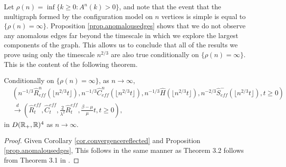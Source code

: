 Let $\rho(n)=\inf\{k\geq 0:A^n(k)>0\}$, and note that the event that the multigraph formed by the configuration model on $n$ vertices is simple is equal to $\{\rho(n)=\infty\}$. Proposition \ref{prop.anomalousedges} shows that we do not observe any anomalous edges far beyond the timescale in which we explore the largest components of the graph. This allows us to conclude that all of the results we prove using only the timescale $n^{2/3}$ are also true conditionally on $\{\rho(n)=\infty\}$. This is the content of the following theorem.
\begin{theorem}
Conditionally on $\{\rho(n)=\infty\}$, as $n\to \infty$, 
\begin{align*}&\left(n^{-1/3}\hat{R}^n_{eff}\left(\lfloor n^{2/3}t\rfloor\right),n^{-1/3}\hat{C}^n_{eff}\left(\lfloor n^{2/3}t\rfloor\right),n^{-1/3}\hat{H}\left( \lfloor n^{2/3} t \rfloor \right),n^{-2/3}\hat{S}^-_{eff}\left(\lfloor n^{2/3}t\rfloor \right), t\geq 0\right)\\
&\overset{d}{\to}\left(\hat{R}^{eff}_t,\hat{C}^{eff}_t, \frac{2}{\lambda^2}\hat{R}^{eff}_t ,\frac{\beta-\mu}{\mu}t,  t\geq 0\right),\end{align*}
in $D({\mathbb R}_+,{\mathbb R})^4$ as $n\to \infty$.
\end{theorem}
\begin{proof}
Given Corollary \ref{cor.convergencereflected} and Proposition \ref{prop.anomalousedges}, This follows in the same manner as Theorem 3.2 follows from Theorem 3.1 in \cite{Joseph2014}.
\end{proof}
